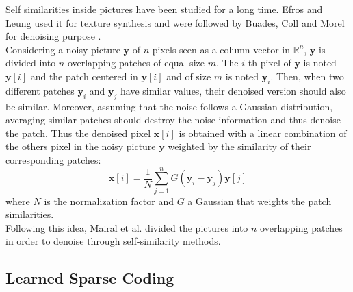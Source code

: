 \documentclass{ipol}
\newcommand{\psize}{m}
\newcommand{\denoi}{\textbf{x}}
\newcommand{\noi}{\textbf{y}}
\newcommand{\Rn}{\mathbb{R}^n}
\begin{document}
Self similarities inside pictures have been studied for a long time. Efros and Leung used it for texture synthesis \cite{Patch01} and were followed by Buades, Coll and Morel for denoising purpose \cite{Patch02}.\\
Considering a noisy picture $\noi$ of $n$ pixels seen as a column vector in $\Rn$, $\noi$ is divided into $n$ overlapping patches of equal size $\psize$. The $i$-th pixel of $\noi$ is noted $\noi[i]$ and the patch centered in $\noi[i]$ and of size $\psize$ is noted $\noi_i$. Then, when two different patches $\noi_i$ and $\noi_j$ have similar values, their denoised version should also be similar. Moreover, assuming that the noise follows a Gaussian distribution, averaging similar patches should destroy the noise information and thus denoise the patch. Thus the denoised pixel $\denoi[i]$ is obtained with a linear combination of the others pixel in the noisy picture $\noi$ weighted by the similarity of their corresponding patches:
\begin{equation}
	\denoi[i] = \frac{1}{N} \sum_{j=1}^n G(\noi_i - \noi_j) \noi[j]
\end{equation}
where $N$ is the normalization factor and $G$ a Gaussian that weights the patch similarities.\\ 
Following this idea, Mairal et al. \cite{LSSC} divided the pictures into $n$ overlapping patches in order to denoise through self-similarity methods.

\subsection{ Learned Sparse Coding}
\end{document}
